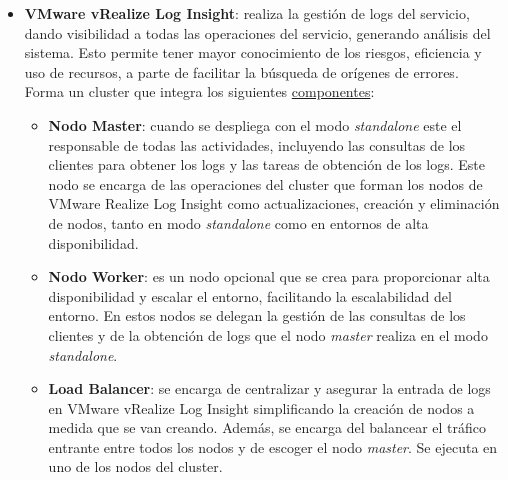 \begin{itemize}
\begin{itemize}
    \end{itemize}
    \item \textbf{VMware vRealize Log Insight}: realiza la gestión de logs del servicio, dando visibilidad a todas las operaciones del servicio, generando análisis del sistema. Esto permite tener mayor conocimiento de los riesgos, eficiencia y uso de recursos, a parte de facilitar la búsqueda de orígenes de errores.\\
    Forma un cluster que integra los siguientes \underline{componentes}:
    \begin{itemize}
        \item \textbf{Nodo Master}: cuando se despliega con el modo \textit{standalone} este el responsable de todas las actividades, incluyendo las consultas de los clientes para obtener los logs y las tareas de obtención de los logs. Este nodo se encarga de las operaciones del cluster que forman los nodos de VMware Realize Log Insight como actualizaciones, creación y eliminación de nodos, tanto en modo \textit{standalone} como en entornos de alta disponibilidad. 
        
        \item \textbf{Nodo Worker}: es un nodo opcional que se crea para proporcionar alta disponibilidad y escalar el entorno, facilitando la escalabilidad del entorno. En estos nodos se delegan la gestión de las consultas de los clientes y de la obtención de logs que el nodo \textit{master} realiza en el modo \textit{standalone}.
        \item \textbf{Load Balancer}: se encarga de centralizar y asegurar la entrada de logs en VMware vRealize Log Insight simplificando la creación de nodos a medida que se van creando. Además, se encarga del balancear el tráfico entrante entre todos los nodos y de escoger el nodo \textit{master}. Se ejecuta en uno de los nodos del cluster.
    \end{itemize}
    

\end{itemize}
